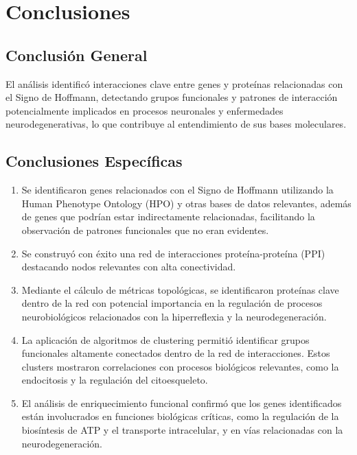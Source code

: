 \section{Conclusiones}

\subsection{Conclusión General}

El análisis identificó interacciones clave entre genes y proteínas relacionadas con el Signo de Hoffmann, detectando grupos funcionales y patrones de interacción potencialmente implicados en procesos neuronales y enfermedades neurodegenerativas, lo que contribuye al entendimiento de sus bases moleculares.

\subsection{Conclusiones Específicas}

\begin{enumerate}
	\item Se identificaron genes relacionados con el Signo de Hoffmann utilizando la Human Phenotype Ontology (HPO) y otras bases de datos relevantes, además de genes que podrían estar indirectamente relacionadas, facilitando la observación de patrones funcionales que no eran evidentes.
	
	\item Se construyó con éxito una red de interacciones proteína-proteína (PPI) destacando nodos relevantes con alta conectividad.
	
	\item Mediante el cálculo de métricas topológicas, se identificaron proteínas clave dentro de la red con potencial importancia en la regulación de procesos neurobiológicos relacionados con la hiperreflexia y la neurodegeneración.
	
	\item La aplicación de algoritmos de clustering permitió identificar grupos funcionales altamente conectados dentro de la red de interacciones. Estos clusters mostraron correlaciones con procesos biológicos relevantes, como la endocitosis y la regulación del citoesqueleto.
	
	\item El análisis de enriquecimiento funcional confirmó que los genes identificados están involucrados en funciones biológicas críticas, como la regulación de la biosíntesis de ATP y el transporte intracelular, y en vías relacionadas con la neurodegeneración.
\end{enumerate}

